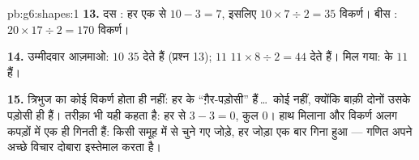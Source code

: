 \begin{solution}{pb:g6:shapes:1}
\textbf{13.} दस : हर एक से $10 - 3 = 7$, इसलिए
$10 \times 7 \div 2 = 35$ विकर्ण। बीस :
$20 \times 17 \div 2 = 170$ विकर्ण।

\textbf{14.} उम्मीदवार आज़माओ: $10$  $35$ देते हैं (प्रश्न
13); $11$  $11 \times 8 \div 2 = 44$ देते हैं। मिल गया:
 के $11$  हैं।

\textbf{15.} त्रिभुज का कोई विकर्ण होता ही नहीं: हर  के
``ग़ैर-पड़ोसी'' हैं\,\dots\ कोई नहीं, क्योंकि बाक़ी दोनों
 उसके पड़ोसी ही हैं। तरीक़ा भी यही कहता है: हर  से
$3 - 3 = 0$, कुल $0$। हाथ मिलाना और विकर्ण अलग कपड़ों में एक ही
गिनती हैं: किसी समूह में से चुने गए जोड़े, हर जोड़ा एक बार गिना
हुआ --- गणित अपने अच्छे विचार दोबारा इस्तेमाल करता है।

\end{solution}
